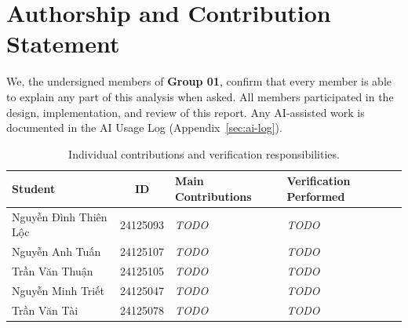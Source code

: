 \section*{Authorship and Contribution Statement}

We, the undersigned members of \textbf{Group 01}, confirm that every member is able
to explain any part of this analysis when asked.  All members participated in
the design, implementation, and review of this report.  Any AI-assisted work
is documented in the AI Usage Log (Appendix~\ref{sec:ai-log}).

\bigskip

\begin{table}[H]
\centering
\caption{Individual contributions and verification responsibilities.}
\label{tab:contributions}
\begin{tabularx}{\textwidth}{l c X X}
\toprule
\textbf{Student} & \textbf{ID} & \textbf{Main Contributions} & \textbf{Verification Performed} \\
\midrule
Nguyễn Đình Thiên Lộc &
    24125093 &
    \textit{TODO} &
    \textit{TODO} \\[6pt]
Nguyễn Anh Tuấn &
    24125107 &
    \textit{TODO} &
    \textit{TODO} \\[6pt]
Trần Văn Thuận &
    24125105 &
    \textit{TODO} &
    \textit{TODO} \\[6pt]
Nguyễn Minh Triết &
    24125047 &
    \textit{TODO} &
    \textit{TODO} \\[6pt]
Trần Văn Tài &
    24125078 &
    \textit{TODO} &
    \textit{TODO} \\
\bottomrule
\end{tabularx}
\end{table}
